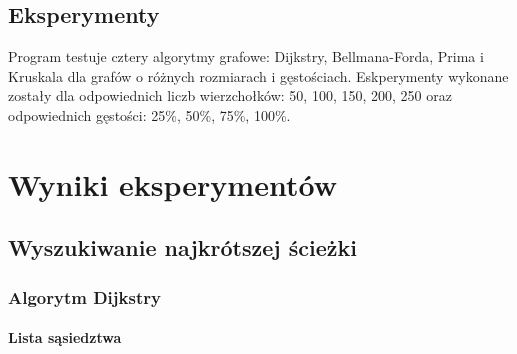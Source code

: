 \documentclass[11pt]{article}
\begin{document}
\subsection{Eksperymenty}
Program testuje cztery algorytmy grafowe: Dijkstry, Bellmana-Forda, Prima i Kruskala dla grafów o różnych rozmiarach i gęstościach.
Eskperymenty wykonane zostały dla odpowiednich liczb wierzchołków: 50, 100, 150, 200, 250 oraz odpowiednich gęstości: 25\%, 50\%, 75\%, 100\%.


\section{Wyniki eksperymentów}

\subsection{Wyszukiwanie najkrótszej ścieżki}
\subsubsection{Algorytm Dijkstry}

\paragraph{Lista sąsiedztwa}
\end{document}
